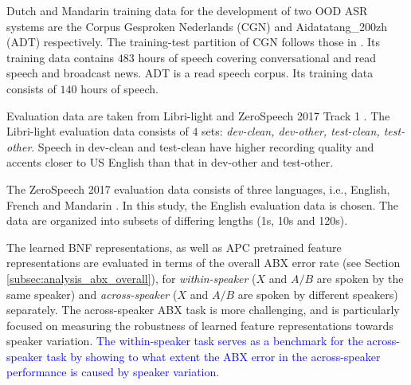 \documentclass[transmag]{IEEEtran}
\begin{document}
Dutch and Mandarin training data for the development of two OOD ASR systems are the Corpus Gesproken Nederlands (CGN) \cite{oostdijk2000spoken} and Aidatatang\_200zh (ADT) \cite{aidatatang} respectively. The training-test partition of CGN follows those in \cite{laurensw75cgn_kaldi}. Its training data contains $483$ hours of speech covering conversational and read speech and broadcast news. ADT is a read speech corpus. Its training data consists of $140$ hours of speech.

Evaluation data are taken from Libri-light and ZeroSpeech 2017 Track 1 \cite{dunbar2017zero}. The Libri-light evaluation data consists of $4$ sets: \textit{dev-clean, dev-other, test-clean, test-other}. Speech in dev-clean and test-clean have higher recording quality and accents closer to US English than that in dev-other and test-other.

The ZeroSpeech 2017 evaluation data consists of three languages, i.e., English, French and Mandarin \cite{dunbar2017zero}. In this study, the English evaluation data is chosen. The data are organized into subsets of differing lengths (1s, 10s and 120s). 

The learned BNF representations, as well as APC pretrained feature representations are evaluated in terms of the overall ABX error rate (see Section \ref{subsec:analysis_abx_overall}), for \textit{within-speaker} ($X$ and $A/B$ are spoken by the same speaker) and \textit{across-speaker} ($X$ and $A/B$ are spoken by different speakers) separately. The across-speaker ABX task is more challenging, and is particularly focused on measuring the robustness of learned feature representations towards speaker variation. \textcolor{blue}{The within-speaker task serves as a benchmark for the across-speaker task by showing to what extent the ABX error in the across-speaker performance is caused by speaker variation.}
\end{document}
